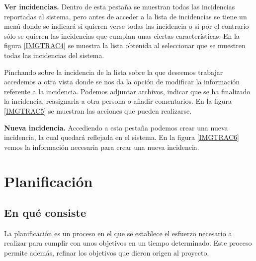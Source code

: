 \documentclass[11pt,a4paper,spanish,twoside]{report}
\begin{document}
\begin{description}

          \item \textbf{Ver incidencias.} Dentro de esta pestaña se muestran
            todas las incidencias reportadas al sistema, pero antes de
            acceder a la lista de incidencias se tiene un menú donde se
            indicará si quieren verse todas las incidencia o si por el
            contrario sólo se quieren las incidencias que cumplan unas
            ciertas características.
            En la figura \ref{IMGTRAC4} se muestra la lista obtenida al
            seleccionar que se muestren todas las incidencias del sistema.


            Pinchando sobre la incidencia de la lista sobre la que deseemos
            trabajar accedemos a otra vista donde se nos da la opción de
            modificar la información referente a la incidencia. Podemos
            adjuntar archivos, indicar que se ha finalizado la incidencia,
            reasignarla a otra persona o añadir comentarios. En la figura
            \ref{IMGTRAC5} se muestran las acciones que pueden realizarse.


          \item \textbf{Nueva incidencia.} Accediendo a esta pestaña podemos
            crear una nueva incidencia, la cual quedará reflejada en el
            sistema. En la figura \ref{IMGTRAC6} vemos la información
            necesaria para crear una nueva incidencia.


        \end{description}

\chapter{Planificación}
\section{En qué consiste}
La planificación es un proceso en el que se establece el esfuerzo necesario
a realizar para cumplir con unos objetivos en un tiempo determinado. Este
proceso permite además, refinar los objetivos que dieron origen al proyecto.
\end{document}
